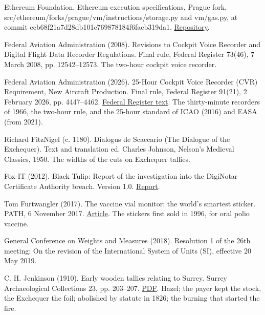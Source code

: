 \documentclass[11pt,twoside]{article}
\theoremstyle{thielethm}
\theoremstyle{thieledef}
\theoremstyle{thieledef}
\theoremstyle{thieledef}
\theoremstyle{thielethm}
\theoremstyle{thieleobs}
\theoremstyle{thielethm}
\begin{document}
\noindent Ethereum Foundation. Ethereum execution specifications, Prague fork, src/ethereum/forks/prague/vm/instructions/storage.py and vm/gas.py, at commit ecb68f21a7d28db101c769878184f6facb319da1. \href{https://github.com/ethereum/execution-specs}{Repository}.
\par\medskip

\noindent Federal Aviation Administration (2008). Revisions to Cockpit Voice Recorder and Digital Flight Data Recorder Regulations. Final rule, Federal Register 73(46), 7 March 2008, pp. 12542--12573. The two-hour cockpit voice recorder.
\par\medskip

\noindent Federal Aviation Administration (2026). 25-Hour Cockpit Voice Recorder (CVR) Requirement, New Aircraft Production. Final rule, Federal Register 91(21), 2 February 2026, pp. 4447--4462. \href{https://www.govinfo.gov/content/pkg/FR-2026-02-02/html/2026-02110.htm}{Federal Register text}. The thirty-minute recorders of 1966, the two-hour rule, and the 25-hour standard of ICAO (2016) and EASA (from 2021).
\par\medskip

\noindent Richard FitzNigel (c. 1180). Dialogus de Scaccario (The Dialogue of the Exchequer). Text and translation ed. Charles Johnson, Nelson's Medieval Classics, 1950. The widths of the cuts on Exchequer tallies.
\par\medskip

\noindent Fox-IT (2012). Black Tulip: Report of the investigation into the DigiNotar Certificate Authority breach. Version 1.0. \href{https://roselabs.nl/files/audit_reports/Fox-IT_-_DigiNotar.pdf}{Report}.
\par\medskip

\noindent Tom Furtwangler (2017). The vaccine vial monitor: the world's smartest sticker. PATH, 6 November 2017. \href{https://www.path.org/articles/vaccine-vial-monitor-worlds-smartest-sticker/}{Article}. The stickers first sold in 1996, for oral polio vaccine.
\par\medskip

\noindent General Conference on Weights and Measures (2018). Resolution 1 of the 26th meeting: On the revision of the International System of Units (SI), effective 20 May 2019.
\par\medskip

\noindent C. H. Jenkinson (1910). Early wooden tallies relating to Surrey. Surrey Archaeological Collections 23, pp. 203--207. \href{https://archaeologydataservice.ac.uk/catalogue/adsdata/arch-379-1/dissemination/pdf/vol_23/surreyac023_203-207_jenkinson.pdf}{PDF}. Hazel; the payer kept the stock, the Exchequer the foil; abolished by statute in 1826; the burning that started the fire.
\par\medskip
\end{document}
